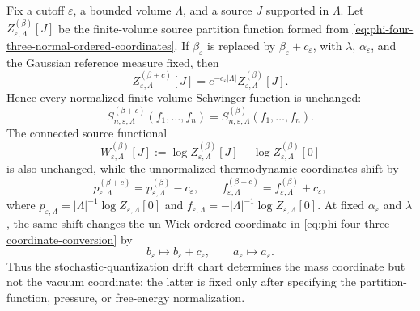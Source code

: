 \begin{proposition}
\label{prop:phi-four-three-vacuum-coordinate-normalization}
Fix a cutoff \(\varepsilon\), a bounded volume \(\Lambda\), and a source
\(J\) supported in \(\Lambda\).  Let \(Z_{\varepsilon,\Lambda}^{(\beta)}[J]\)
be the finite-volume source partition function formed from
\eqref{eq:phi-four-three-normal-ordered-coordinates}.  If
\(\beta_\varepsilon\) is replaced by
\(\beta_\varepsilon+c_\varepsilon\), with
\(\lambda\), \(\alpha_\varepsilon\), and the Gaussian reference measure fixed,
then
\begin{equation}
  Z_{\varepsilon,\Lambda}^{(\beta+c)}[J]
  =
  e^{-c_\varepsilon|\Lambda|}
  Z_{\varepsilon,\Lambda}^{(\beta)}[J].
  \label{eq:phi-four-three-vacuum-coordinate-partition-shift}
\end{equation}
Hence every normalized finite-volume Schwinger function is unchanged:
\begin{equation}
  S_{n,\varepsilon,\Lambda}^{(\beta+c)}(f_1,\ldots,f_n)
  =
  S_{n,\varepsilon,\Lambda}^{(\beta)}(f_1,\ldots,f_n).
  \label{eq:phi-four-three-vacuum-coordinate-normalized-schwinger}
\end{equation}
The connected source functional
\[
  W_{\varepsilon,\Lambda}^{(\beta)}[J]
  :=
  \log Z_{\varepsilon,\Lambda}^{(\beta)}[J]
  -\log Z_{\varepsilon,\Lambda}^{(\beta)}[0]
\]
is also unchanged, while the unnormalized thermodynamic coordinates shift by
\begin{equation}
  p_{\varepsilon,\Lambda}^{(\beta+c)}
  =
  p_{\varepsilon,\Lambda}^{(\beta)}
  -c_\varepsilon,\qquad
  f_{\varepsilon,\Lambda}^{(\beta+c)}
  =
  f_{\varepsilon,\Lambda}^{(\beta)}
  +c_\varepsilon,
  \label{eq:phi-four-three-vacuum-coordinate-pressure-shift}
\end{equation}
where
\(p_{\varepsilon,\Lambda}=|\Lambda|^{-1}\log
Z_{\varepsilon,\Lambda}[0]\) and
\(f_{\varepsilon,\Lambda}=-|\Lambda|^{-1}\log
Z_{\varepsilon,\Lambda}[0]\).
At fixed \(\alpha_\varepsilon\) and \(\lambda\), the same shift changes the
un-Wick-ordered coordinate in
\eqref{eq:phi-four-three-coordinate-conversion} by
\[
  b_\varepsilon\longmapsto b_\varepsilon+c_\varepsilon,
  \qquad
  a_\varepsilon\longmapsto a_\varepsilon .
\]
Thus the stochastic-quantization drift chart determines the mass coordinate
but not the vacuum coordinate; the latter is fixed only after specifying the
partition-function, pressure, or free-energy normalization.
\end{proposition}

